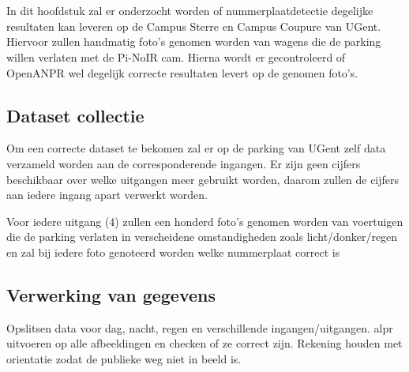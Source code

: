 
\chapter{}
\label{ch:praktischeUitvoering}
In dit hoofdstuk zal er onderzocht worden of nummerplaatdetectie degelijke resultaten kan leveren op de Campus Sterre en Campus Coupure van UGent. Hiervoor zullen handmatig foto's genomen worden van wagens die de parking willen verlaten met de Pi-NoIR cam. Hierna wordt er gecontroleerd of OpenANPR wel degelijk correcte resultaten levert op de genomen foto's.

\section{Dataset collectie}
Om een correcte dataset te bekomen zal er op de parking van UGent zelf data verzameld worden aan de corresponderende ingangen. Er zijn geen cijfers beschikbaar over welke uitgangen meer gebruikt worden, daarom zullen de cijfers aan iedere ingang apart verwerkt worden.

Voor iedere uitgang (4) zullen een honderd foto's genomen worden van voertuigen die de parking verlaten in verscheidene omstandigheden zoals licht/donker/regen en zal bij iedere foto genoteerd worden welke nummerplaat correct is

\section{Verwerking van gegevens}

Opslitsen data voor dag, nacht, regen en verschillende ingangen/uitgangen.
alpr uitvoeren op alle afbeeldingen en checken of ze correct zijn. Rekening houden met orientatie zodat de publieke weg niet in beeld is.